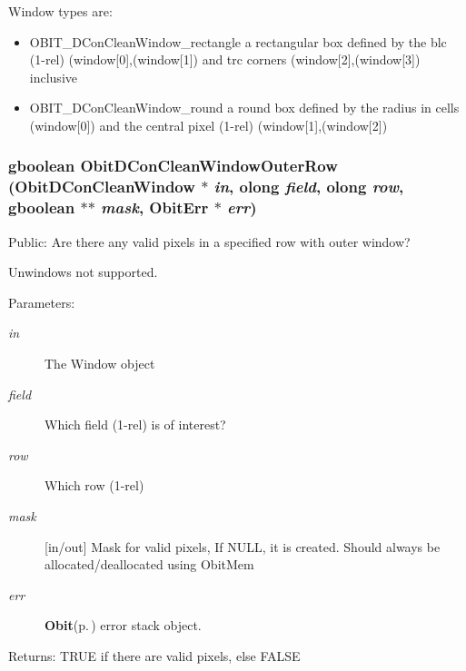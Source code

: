 Window types are: \begin{itemize}
\item OBIT\_\-DCon\-Clean\-Window\_\-rectangle a rectangular box defined by the blc (1-rel) (window[0],(window[1]) and trc corners (window[2],(window[3]) inclusive \item OBIT\_\-DCon\-Clean\-Window\_\-round a round box defined by the radius in cells (window[0]) and the central pixel (1-rel) (window[1],(window[2]) 
\end{itemize}
\subsubsection{\setlength{\rightskip}{0pt plus 5cm}gboolean Obit\-DCon\-Clean\-Window\-Outer\-Row ({\bf Obit\-DCon\-Clean\-Window} $\ast$ {\em in}, {\bf olong} {\em field}, {\bf olong} {\em row}, gboolean $\ast$$\ast$ {\em mask}, {\bf Obit\-Err} $\ast$ {\em err})}\label{ObitDConCleanWindow_8c_a27}


Public: Are there any valid pixels in a specified row with outer window? 

Unwindows not supported. \begin{Desc}
\item[Parameters:]
\begin{description}
\item[{\em in}]The Window object \item[{\em field}]Which field (1-rel) is of interest? \item[{\em row}]Which row (1-rel) \item[{\em mask}][in/out] Mask for valid pixels, If NULL, it is created. Should always be allocated/deallocated using Obit\-Mem \item[{\em err}]{\bf Obit}{\rm (p.\,\pageref{structObit})} error stack object. \end{description}
\end{Desc}
\begin{Desc}
\item[Returns:]TRUE if there are valid pixels, else FALSE \end{Desc}
